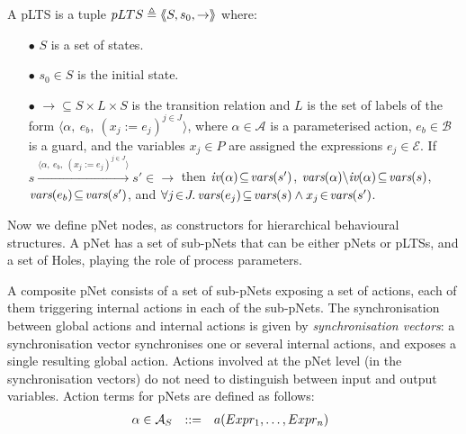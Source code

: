\documentclass{lncs/llncs}
\def\AlgE{\mathcal{E}}
\def\AlgA{\mathcal{A}}
\def\AlgAS{\mathcal{A}_S}
\def\AlgB{\mathcal{B}}
\begin{document}
\begin{definition}[pLTS]
\label{pLTS}
A pLTS is a tuple
$pLTS\triangleq\langle\hspace{-0.58ex}\langle S,s_0, \to\rangle\hspace{-0.58ex}\rangle$ where:
\begin{itemize}
\item[$\bullet$]
$S$ is a set of states.
\item[$\bullet$]
$s_0 \in S$ is the initial state.
\item[$\bullet$] $\to \subseteq S \times L \times S$ is the transition relation and 
$L$ is the set of labels of the form
$\langle \alpha,~e_b,~(x_j\!:= {e}_j)^{j\in J}\rangle$,
where $\alpha \in\AlgA$ is a parameterised action, $e_b \in
\AlgB$ is a guard, and the variables $x_j\in P$
are assigned the expressions $e_j\in \AlgE$.
If 
$s \xrightarrow{\langle \alpha,~e_b,~(x_j\!:= {e}_j)^{j\in
		J}\rangle} s'\in \to $ then $\iv(\alpha)\!\subseteq\! \vars(s')$, 
		$\vars(\alpha)\backslash \iv(\alpha)\!\subseteq\! \vars(s)$, 
		$\vars(e_b)\!\subseteq\! \vars(s')$, and
		$\forall j\!\in\! J .\,\vars(e_j)\!\subseteq\! \vars(s)\land 
		x_j\!\in\!\vars(s')$. %
		
\end{itemize}
\end{definition}

Now we define
pNet nodes, as constructors for hierarchical behavioural structures.
A pNet has a set of sub-pNets that can be either pNets or pLTSs, and a
set of Holes, playing the role of process parameters.

A composite pNet consists of a set of sub-pNets exposing
a set of actions, each of them triggering internal actions in each of
the sub-pNets. The synchronisation between global actions and
internal actions is given by  \emph{synchronisation vectors}: a
synchronisation vector synchronises one or several internal actions, and
exposes a single resulting global action.
Actions involved at the pNet level (in the synchronisation vectors) do
not need to distinguish between input and output
variables. Action terms for pNets are defined as follows:
\[\begin{array}[l]{rcl@{\quad}l}
  \alpha\in \AlgAS &::=&a(Expr_1,\ldots,Expr_n)
\end{array}
\]
\end{document}
